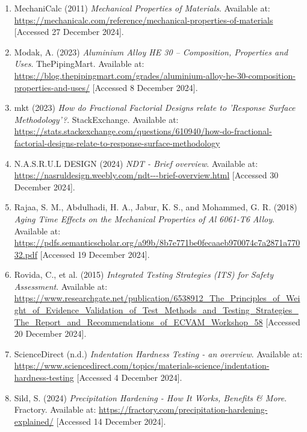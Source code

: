 \documentclass{article}
\begin{document}
{\begin{enumerate}
    \item MechaniCalc (2011) \textit{Mechanical Properties of Materials}. Available at: \url{https://mechanicalc.com/reference/mechanical-properties-of-materials} [Accessed 27 December 2024].
    
    \item Modak, A. (2023) \textit{Aluminium Alloy HE 30 – Composition, Properties and Uses}. ThePipingMart. Available at: \url{https://blog.thepipingmart.com/grades/aluminium-alloy-he-30-composition-properties-and-uses/} [Accessed 8 December 2024].
    
    \item mkt (2023) \textit{How do Fractional Factorial Designs relate to 'Response Surface Methodology'?}. StackExchange. Available at: \url{https://stats.stackexchange.com/questions/610940/how-do-fractional-factorial-designs-relate-to-response-surface-methodology}
    
    \item N.A.S.R.U.L DESIGN (2024) \textit{NDT - Brief overview}. Available at: \url{https://nasruldesign.weebly.com/ndt---brief-overview.html} [Accessed 30 December 2024].
    
    \item Rajaa, S. M., Abdulhadi, H. A., Jabur, K. S., and Mohammed, G. R. (2018) \textit{Aging Time Effects on the Mechanical Properties of Al 6061-T6 Alloy}. Available at: \url{https://pdfs.semanticscholar.org/a99b/8b7e771be0fecaaeb970074c7a2871a77032.pdf} [Accessed 19 December 2024].
    
    \item Rovida, C., et al. (2015) \textit{Integrated Testing Strategies (ITS) for Safety Assessment}. Available at: \url{https://www.researchgate.net/publication/6538912_The_Principles_of_Weight_of_Evidence_Validation_of_Test_Methods_and_Testing_Strategies_The_Report_and_Recommendations_of_ECVAM_Workshop_58} [Accessed 20 December 2024].
    
    \item ScienceDirect (n.d.) \textit{Indentation Hardness Testing - an overview}. Available at: \url{https://www.sciencedirect.com/topics/materials-science/indentation-hardness-testing} [Accessed 4 December 2024].
    
    \item Sild, S. (2024) \textit{Precipitation Hardening - How It Works, Benefits \& More}. Fractory. Available at: \url{https://fractory.com/precipitation-hardening-explained/} [Accessed 14 December 2024].
    

\end{enumerate}}
\end{document}
